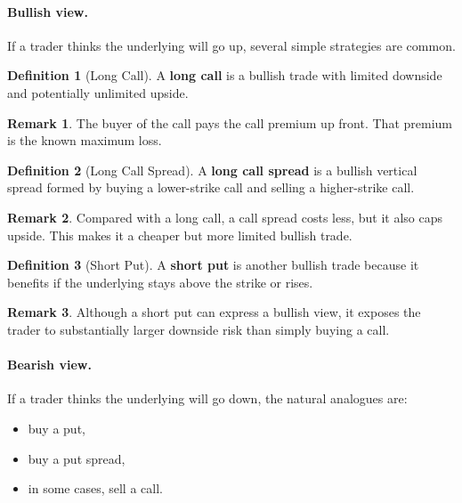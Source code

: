 \documentclass[11pt]{article}
\theoremstyle{definition}
\newtheorem{definition}{Definition}[section]
\newtheorem{remark}{Remark}[section]
\begin{document}
\paragraph{Bullish view.}
If a trader thinks the underlying will go up, several simple strategies are common.

\begin{definition}[Long Call]
A \textbf{long call} is a bullish trade with limited downside and potentially unlimited upside.
\end{definition}

\begin{remark}
The buyer of the call pays the call premium up front. That premium is the known maximum loss.
\end{remark}

\begin{definition}[Long Call Spread]
A \textbf{long call spread} is a bullish vertical spread formed by buying a lower-strike call and selling a higher-strike call.
\end{definition}

\begin{remark}
Compared with a long call, a call spread costs less, but it also caps upside. This makes it a cheaper but more limited bullish trade.
\end{remark}

\begin{definition}[Short Put]
A \textbf{short put} is another bullish trade because it benefits if the underlying stays above the strike or rises.
\end{definition}

\begin{remark}
Although a short put can express a bullish view, it exposes the trader to substantially larger downside risk than simply buying a call.
\end{remark}

\paragraph{Bearish view.}
If a trader thinks the underlying will go down, the natural analogues are:

\begin{itemize}[leftmargin=2em]
    \item buy a put,
    \item buy a put spread,
    \item in some cases, sell a call.
\end{itemize}
\end{document}
